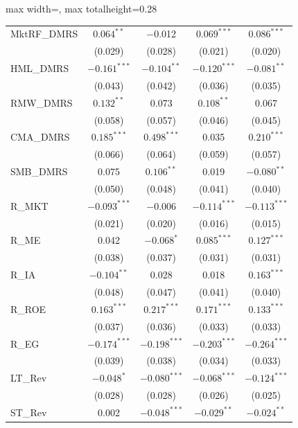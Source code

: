 \begin{table}[htbp]
{\begin{adjustbox}{max width=\linewidth, max totalheight=0.28\textheight}
\begin{tabular}{lcccc}
\midrule
MktRF\_DMRS & $0.064^{**}$ & \phantom{(}$-$0.012\phantom{)} & $0.069^{***}$ & $0.086^{***}$ \\
 & (0.029) & \phantom{$-$}(0.028) & (0.021) & (0.020) \\
HML\_DMRS & $-0.161^{***}$ & $-0.104^{**}$ & $-0.120^{***}$ & $-0.081^{**}$ \\
 & (0.043) & \phantom{$-$}(0.042) & (0.036) & (0.035) \\
RMW\_DMRS & $0.132^{**}$ & \phantom{$-$(}0.073\phantom{)} & $0.108^{**}$ & \phantom{(}0.067\phantom{)} \\
 & (0.058) & \phantom{$-$}(0.057) & (0.046) & (0.045) \\
CMA\_DMRS & $0.185^{***}$ & $0.498^{***}$ & \phantom{(}0.035\phantom{)} & $0.210^{***}$ \\
 & (0.066) & \phantom{$-$}(0.064) & (0.059) & (0.057) \\
SMB\_DMRS & \phantom{(}0.075\phantom{)} & $0.106^{**}$ & \phantom{(}0.019\phantom{)} & $-0.080^{**}$ \\
 & (0.050) & \phantom{$-$}(0.048) & (0.041) & (0.040) \\
R\_MKT & $-0.093^{***}$ & \phantom{(}$-$0.006\phantom{)} & $-0.114^{***}$ & $-0.113^{***}$ \\
 & (0.021) & \phantom{$-$}(0.020) & (0.016) & (0.015) \\
R\_ME & \phantom{(}0.042\phantom{)} & $-0.068^{*}$ & $0.085^{***}$ & $0.127^{***}$ \\
 & (0.038) & \phantom{$-$}(0.037) & (0.031) & (0.031) \\
R\_IA & $-0.104^{**}$ & \phantom{$-$(}0.028\phantom{)} & \phantom{(}0.018\phantom{)} & $0.163^{***}$ \\
 & (0.048) & \phantom{$-$}(0.047) & (0.041) & (0.040) \\
R\_ROE & $0.163^{***}$ & $0.217^{***}$ & $0.171^{***}$ & $0.133^{***}$ \\
 & (0.037) & \phantom{$-$}(0.036) & (0.033) & (0.033) \\
R\_EG & $-0.174^{***}$ & $-0.198^{***}$ & $-0.203^{***}$ & $-0.264^{***}$ \\
 & (0.039) & \phantom{$-$}(0.038) & (0.034) & (0.033) \\
LT\_Rev & $-0.048^{*}$ & $-0.080^{***}$ & $-0.068^{***}$ & $-0.124^{***}$ \\
 & (0.028) & \phantom{$-$}(0.028) & (0.026) & (0.025) \\
ST\_Rev & \phantom{(}0.002\phantom{)} & $-0.048^{***}$ & $-0.029^{**}$ & $-0.024^{**}$ \\

\end{tabular}
\end{adjustbox}}
\end{table}
